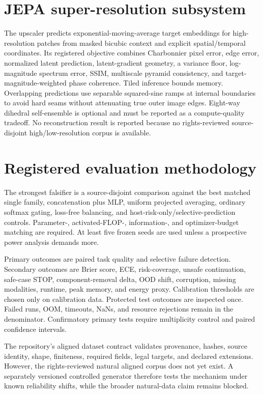 \documentclass[10pt]{article}
\begin{document}
\section{JEPA super-resolution subsystem}
The upscaler predicts exponential-moving-average target embeddings for high-resolution
patches from masked bicubic context and explicit spatial/temporal coordinates. Its
registered objective combines Charbonnier pixel error, edge error, normalized latent
prediction, latent-gradient geometry, a variance floor, log-magnitude spectrum error,
SSIM, multiscale pyramid consistency, and target-magnitude-weighted phase coherence.
Tiled inference bounds memory. Overlapping predictions use separable squared-sine ramps at
internal boundaries to avoid hard seams without attenuating true outer image edges.
Eight-way dihedral self-ensemble is optional and must be reported as a compute-quality
tradeoff. No reconstruction result is reported because no rights-reviewed source-disjoint
high/low-resolution corpus is available.

\section{Registered evaluation methodology}
The strongest falsifier is a source-disjoint comparison against the best matched single
family, concatenation plus MLP, uniform projected averaging, ordinary softmax gating,
loss-free balancing, and host-risk-only/selective-prediction controls. Parameter-,
activated-FLOP-, information-, and optimizer-budget matching are required. At least five
frozen seeds are used unless a prospective power analysis demands more.

Primary outcomes are paired task quality and selective failure detection. Secondary
outcomes are Brier score, ECE, risk-coverage, unsafe continuation, safe-case STOP,
component-removal delta, OOD shift, corruption, missing modalities, runtime, peak memory,
and energy proxy. Calibration thresholds are chosen only on calibration data. Protected
test outcomes are inspected once. Failed runs, OOM, timeouts, NaNs, and resource rejections
remain in the denominator. Confirmatory primary tests require multiplicity control and
paired confidence intervals.

The repository's aligned dataset contract validates provenance, hashes, source identity,
shape, finiteness, required fields, legal targets, and declared extensions. However, the
rights-reviewed natural aligned corpus does not yet exist. A separately versioned
controlled generator therefore tests the mechanism under known reliability shifts, while
the broader natural-data claim remains blocked.
\end{document}
